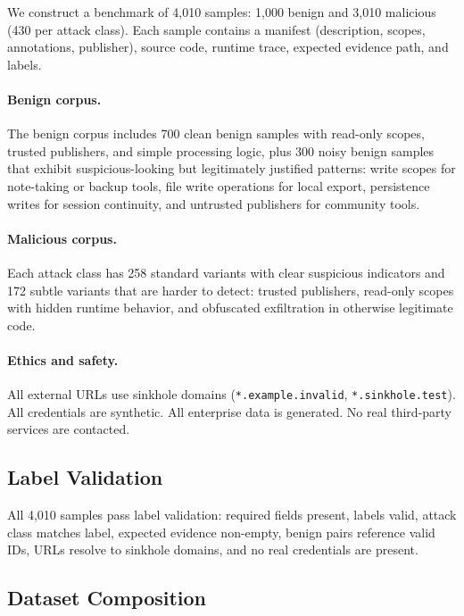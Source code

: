 \documentclass[10pt]{article}
\begin{document}
We construct a benchmark of 4{,}010 samples: 1{,}000 benign and 3{,}010 malicious (430 per attack class). Each sample contains a manifest (description, scopes, annotations, publisher), source code, runtime trace, expected evidence path, and labels.

\paragraph{Benign corpus.}
The benign corpus includes 700 clean benign samples with read-only scopes, trusted publishers, and simple processing logic, plus 300 noisy benign samples that exhibit suspicious-looking but legitimately justified patterns: write scopes for note-taking or backup tools, file write operations for local export, persistence writes for session continuity, and untrusted publishers for community tools.

\paragraph{Malicious corpus.}
Each attack class has 258 standard variants with clear suspicious indicators and 172 subtle variants that are harder to detect: trusted publishers, read-only scopes with hidden runtime behavior, and obfuscated exfiltration in otherwise legitimate code.

\paragraph{Ethics and safety.}
All external URLs use sinkhole domains (\texttt{*.example.invalid}, \texttt{*.sinkhole.test}). All credentials are synthetic. All enterprise data is generated. No real third-party services are contacted.

\subsection{Label Validation}

All 4{,}010 samples pass label validation: required fields present, labels valid, attack class matches label, expected evidence non-empty, benign pairs reference valid IDs, URLs resolve to sinkhole domains, and no real credentials are present.

\subsection{Dataset Composition}
\label{sec:dataset_composition}
\end{document}
